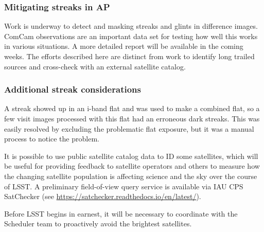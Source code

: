 \subsubsection{Mitigating streaks in AP}

Work is underway to detect and masking streaks and glints in difference images. ComCam observations are an important data set for testing how well this works in various situations. A more detailed report will be available in the coming weeks. The efforts described here are distinct from work to identify long trailed sources and cross-check with an external satellite catalog.

\subsubsection{Additional streak considerations}

A streak showed up in an i-band flat and was used to make a combined flat, so a few visit images processed with this flat had an erroneous dark streaks. This was easily resolved by excluding the problematic flat exposure, but it was a manual process to notice the problem.

It is possible to use public satellite catalog data to ID some satellites, which will be useful for providing feedback to satellite operators and others to measure how the changing satellite population is affecting science and the sky over the course of LSST. A preliminary field-of-view query service is available via IAU CPS SatChecker (see \url{https://satchecker.readthedocs.io/en/latest/}).

Before LSST begins in earnest, it will be necessary to coordinate with the Scheduler team to proactively avoid the brightest satellites.
